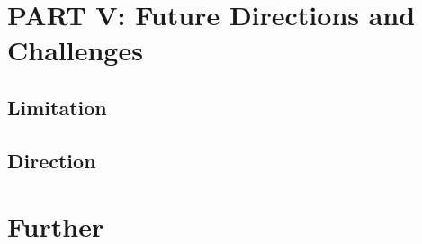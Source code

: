 \documentclass[
  letterpaper,
]{scrbook}
\begin{document}
\part{PART V: Future Directions and Challenges}

\chapter{Limitation}\label{limitation}

\chapter{Direction}\label{direction}

\part{Further}


\backmatter
\end{document}
